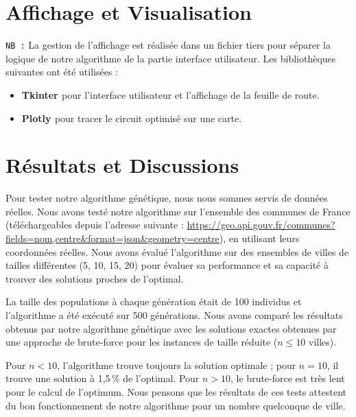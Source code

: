 \documentclass[a4paper,12pt]{article}
\begin{document}
\section{Affichage et Visualisation}
\texttt{NB :}  La gestion de l'affichage est réalisée dans un fichier tiers pour séparer la logique de notre algorithme de la partie interface utilisateur. Les bibliothèques suivantes ont été utilisées :
\begin{itemize}
    \item \textbf{Tkinter \cite{tkinter}} pour l'interface utilisateur et l’affichage de la feuille de route.
    \item \textbf{Plotly \cite{ploty}} pour tracer le circuit optimisé sur une carte.
\end{itemize}

\section{Résultats et Discussions}


Pour tester notre algorithme génétique, nous nous sommes servis de données réelles. Nous avons testé notre algorithme sur l'ensemble des communes de France (téléchargeables depuis l'adresse suivante : \url{https://geo.api.gouv.fr/communes?fields=nom,centre&format=json&geometry=centre}), en utilisant leurs coordonnées réelles. Nous avons évalué l'algorithme sur des ensembles de villes de tailles différentes (5, 10, 15, 20) pour évaluer sa performance et sa capacité à trouver des solutions proches de l'optimal.

La taille des populations à chaque génération était de 100 individus et l'algorithme a été exécuté sur 500 générations. Nous avons comparé les résultats obtenus par notre algorithme génétique avec les solutions exactes obtenues par une approche de brute-force pour les instances de taille réduite ($n \leq 10$ villes).

Pour $n < 10$, l'algorithme trouve toujours la solution optimale ; pour $n = 10$, il trouve une solution à 1,5\,\% de l'optimal. Pour $n > 10$, le brute-force est très lent pour le calcul de l'optimum. Nous pensons que les résultats de ces tests attestent du bon fonctionnement de notre algorithme pour un nombre quelconque de ville.
\end{document}
